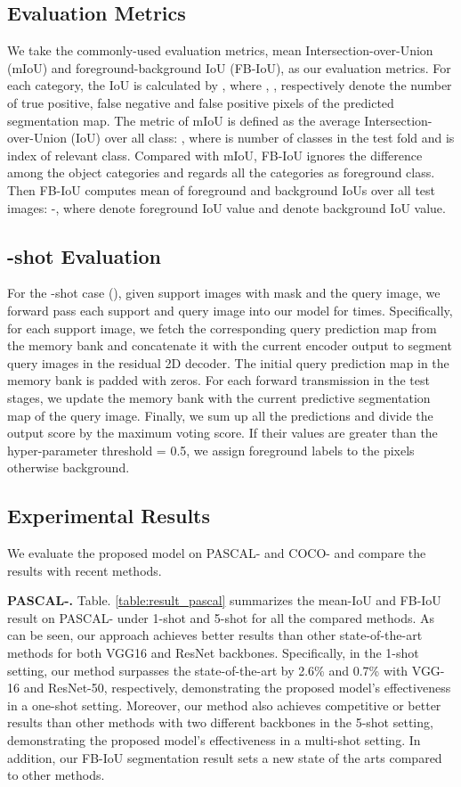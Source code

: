 \documentclass[journal]{IEEEtran}
\begin{document}
\subsection{Evaluation Metrics}
We take the commonly-used evaluation metrics, mean Intersection-over-Union (mIoU) and foreground-background IoU (FB-IoU), as our evaluation metrics. For each category, the IoU is calculated by , where , ,  respectively denote the number of true positive, false negative and false positive pixels of the predicted segmentation map. The metric of mIoU is defined as the average Intersection-over-Union (IoU) over all class: , where  is number of classes in the test fold and  is index of relevant class. Compared with mIoU, FB-IoU ignores the difference among the object categories and regards all the categories as foreground class. Then FB-IoU computes mean of foreground and background IoUs over all test images: -, where  denote foreground IoU value and  denote background IoU value. 

\subsection{-shot Evaluation}
For the -shot case (), given  support images with mask and the query image, we forward pass each support and query image into our model for  times. Specifically, for each support image, we fetch the corresponding query prediction map from the memory bank and concatenate it with the current encoder output to segment query images in the residual 2D decoder. The initial query prediction map in the memory bank is padded with zeros. For each forward transmission in the test stages, we update the memory bank with the current predictive segmentation map of the query image. Finally, we sum up all the  predictions and divide the output score by the maximum voting score. If their values are greater than the hyper-parameter threshold  = 0.5, we assign foreground labels to the pixels otherwise background.



\subsection{Experimental Results}

We evaluate the proposed model on PASCAL- and COCO- and compare the results with recent methods.

\textbf{PASCAL-.} Table. \ref{table:result_pascal} summarizes the mean-IoU and FB-IoU result on PASCAL- under 1-shot and 5-shot for all the compared methods. As can be seen, our approach achieves better results than other state-of-the-art methods for both VGG16 and ResNet backbones. Specifically, in the 1-shot setting, our method surpasses the state-of-the-art by 2.6\% and 0.7\% with VGG-16 and ResNet-50, respectively, demonstrating the proposed model's effectiveness in a one-shot setting. Moreover, our method also achieves competitive or better results than other methods with two different backbones in the 5-shot setting, demonstrating the proposed model's effectiveness in a multi-shot setting. In addition, our FB-IoU segmentation result sets a new state of the arts compared to other methods. 
\end{document}
